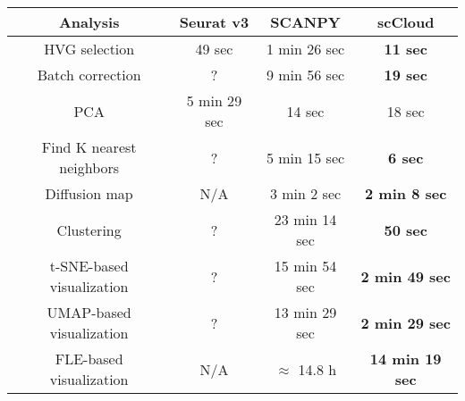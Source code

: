 \documentclass[10pt]{article}
\begin{document}
\begin{table}[H]
	\centering
	\begin{tabular}{|c|c|c|c|}
		\hline
		Analysis & Seurat v3 & SCANPY & scCloud\\
		\hline \hline
		HVG selection & 49 sec & 1 min 26 sec & \textbf{11 sec} \\
		\hline
		Batch correction & ? & 9 min 56 sec & \textbf{19 sec} \\
		\hline
		PCA & 5 min 29 sec & 14 sec & 18 sec \\
		\hline
		Find K nearest neighbors &  ? &  5 min 15 sec & \textbf{6 sec}\\
		\hline
		Diffusion map & N/A & 3 min 2 sec & \textbf{2 min 8 sec} \\
		\hline 
		Clustering & ? & 23 min 14 sec & \textbf{50 sec}\\
		\hline
		t-SNE-based visualization & ? & 15 min 54 sec & \textbf{2 min 49 sec}\\
		\hline
		UMAP-based visualization & ? & 13 min 29 sec & \textbf{2 min 29 sec}\\
		\hline
		FLE-based visualization & N/A & $\approx$ 14.8  h & \textbf{14 min 19 sec}\\
		\hline
	\end{tabular}
\end{table}
\end{document}

